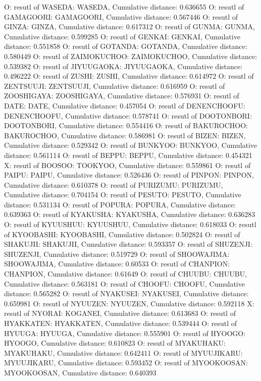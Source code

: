 O: resutl of WASEDA: WASEDA, Cumulative distance: 0.636655
O: resutl of GAMAGOORI: GAMAGOORI, Cumulative distance: 0.567446
O: resutl of GINZA: GINZA, Cumulative distance: 0.617312
O: resutl of GUNMA: GUNMA, Cumulative distance: 0.599285
O: resutl of GENKAI: GENKAI, Cumulative distance: 0.551858
O: resutl of GOTANDA: GOTANDA, Cumulative distance: 0.580449
O: resutl of ZAIMOKUCHOO: ZAIMOKUCHOO, Cumulative distance: 0.539382
O: resutl of JIYUUGAOKA: JIYUUGAOKA, Cumulative distance: 0.496222
O: resutl of ZUSHI: ZUSHI, Cumulative distance: 0.614972
O: resutl of ZENTSUUJI: ZENTSUUJI, Cumulative distance: 0.616959
O: resutl of ZOOSHIGAYA: ZOOSHIGAYA, Cumulative distance: 0.576931
O: resutl of DATE: DATE, Cumulative distance: 0.457054
O: resutl of DENENCHOOFU: DENENCHOOFU, Cumulative distance: 0.578741
O: resutl of DOOTONBORI: DOOTONBORI, Cumulative distance: 0.554416
O: resutl of BAKUROCHOO: BAKUROCHOO, Cumulative distance: 0.586981
O: resutl of BIZEN: BIZEN, Cumulative distance: 0.529342
O: resutl of BUNKYOO: BUNKYOO, Cumulative distance: 0.561114
O: resutl of BEPPU: BEPPU, Cumulative distance: 0.454321
X: resutl of BOOSOO: TOOKYOO, Cumulative distance: 0.559861
O: resutl of PAIPU: PAIPU, Cumulative distance: 0.526436
O: resutl of PINPON: PINPON, Cumulative distance: 0.610378
O: resutl of PURIZUMU: PURIZUMU, Cumulative distance: 0.704154
O: resutl of PESUTO: PESUTO, Cumulative distance: 0.531134
O: resutl of POPURA: POPURA, Cumulative distance: 0.639363
O: resutl of KYAKUSHA: KYAKUSHA, Cumulative distance: 0.636283
O: resutl of KYUUSHUU: KYUUSHUU, Cumulative distance: 0.618033
O: resutl of KYOOBASHI: KYOOBASHI, Cumulative distance: 0.502824
O: resutl of SHAKUJII: SHAKUJII, Cumulative distance: 0.593357
O: resutl of SHUZENJI: SHUZENJI, Cumulative distance: 0.519729
O: resutl of SHOOWAJIMA: SHOOWAJIMA, Cumulative distance: 0.60533
O: resutl of CHANPION: CHANPION, Cumulative distance: 0.61649
O: resutl of CHUUBU: CHUUBU, Cumulative distance: 0.563181
O: resutl of CHOOFU: CHOOFU, Cumulative distance: 0.565282
O: resutl of NYAKUSEI: NYAKUSEI, Cumulative distance: 0.659981
O: resutl of NYUUZEN: NYUUZEN, Cumulative distance: 0.592118
X: resutl of NYORAI: KOGANEI, Cumulative distance: 0.613683
O: resutl of HYAKKATEN: HYAKKATEN, Cumulative distance: 0.539444
O: resutl of HYUUGA: HYUUGA, Cumulative distance: 0.555901
O: resutl of HYOOGO: HYOOGO, Cumulative distance: 0.610823
O: resutl of MYAKUHAKU: MYAKUHAKU, Cumulative distance: 0.642411
O: resutl of MYUUJIKARU: MYUUJIKARU, Cumulative distance: 0.593452
O: resutl of MYOOKOOSAN: MYOOKOOSAN, Cumulative distance: 0.640393
